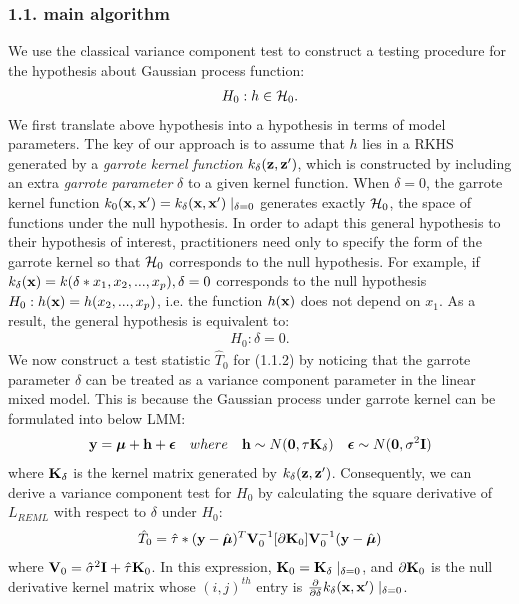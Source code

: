 \documentclass[11pt]{article}
\begin{document}
\subsubsection*{{1.1. main algorithm}}
We use the classical variance component test to construct a testing procedure for the hypothesis about Gaussian process function:
\begin{align}
H_0: h \in {\cal H}_0.
\end{align}
We first translate above hypothesis into a hypothesis in terms of model parameters. The key of our approach is to assume that $h$ lies in a RKHS generated by a \textsl{garrote kernel function}
$k_{\delta}({\bf z}, {\bf z}')$, which is constructed by including an extra \textsl{garrote parameter} $\delta$ to a given kernel function. When $\delta=0$, the garrote kernel function $k_0({\bf x}, {\bf x}')=k_{\delta}({\bf x}, {\bf x}')\mid _{\delta=0}$ generates exactly ${\cal H}_0$, the space of functions under the null hypothesis. In order to adapt this general hypothesis to their hypothesis of interest, practitioners need only to specify the form of the garrote kernel so that ${\cal H}_0$ corresponds to the null hypothesis. For example, if $k_{\delta}({\bf x})=k(\delta * x_1, x_2,..., x_p), \delta=0$ corresponds to the null hypothesis $H_0: h({\bf x})=h(x_2,...,x_p)$, i.e. the function $h({\bf x})$ does not depend on $x_1$. As a result, the general hypothesis is equivalent to:
\begin{align}
H_0: \delta=0.
\end{align}
We now construct a test statistic $\hat{T}_0$ for (1.1.2) by noticing that the garrote parameter $\delta$ can be treated as a variance component parameter in the linear mixed model. This is because the Gaussian process under garrote kernel can be formulated into below LMM:
\begin{align*}
{\bf y}=\boldsymbol{\mu}+{\bf h}+\boldsymbol{\epsilon} \quad where \quad {\bf h} \sim N(\mathbf{0}, \tau {\bf K}_\delta) \quad \boldsymbol{\epsilon} \sim N(\mathbf{0}, \sigma^2{\bf I})
\end{align*}
where ${\bf K}_\delta$ is the kernel matrix generated by $k_{\delta}({\bf z}, {\bf z}')$. Consequently, we can derive a variance component test for $H_0$ by calculating the square derivative of $L_{REML}$ with respect to $\delta$ under $H_0$:
\begin{align}
\hat{T}_0=\hat{\tau}*({\bf y}-\hat{\boldsymbol{\mu}})^T{\bf V}_0^{-1}[\partial {\bf K}_0]{\bf V}_0^{-1}({\bf y}-\hat{\boldsymbol{\mu}})
\end{align}
where ${\bf V}_0=\hat{\sigma}^2{\bf I}+\hat{\tau}{\bf K}_0$. In this expression, ${\bf K}_0={\bf K}_\delta \mid_{\delta=0}$, and $\partial {\bf K}_0$ is the null derivative kernel matrix whose $(i, j)^{th}$ entry is $\frac{\partial }{\partial \delta}k_\delta({\bf x}, {\bf x}') \mid_{\delta=0}$.
\end{document}
